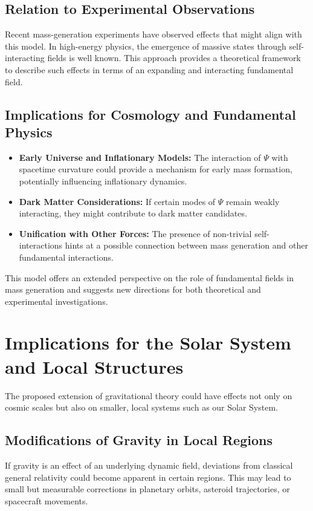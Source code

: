 \documentclass[a4paper,11pt]{article}
\begin{document}
\subsection{Relation to Experimental Observations}
Recent mass-generation experiments have observed effects that might align with this model. In high-energy physics, the emergence of massive states through self-interacting fields is well known. This approach provides a theoretical framework to describe such effects in terms of an expanding and interacting fundamental field.

\subsection{Implications for Cosmology and Fundamental Physics}
\begin{itemize}
	\item \textbf{Early Universe and Inflationary Models:} The interaction of $\Psi$ with spacetime curvature could provide a mechanism for early mass formation, potentially influencing inflationary dynamics.
	\item \textbf{Dark Matter Considerations:} If certain modes of $\Psi$ remain weakly interacting, they might contribute to dark matter candidates.
	\item \textbf{Unification with Other Forces:} The presence of non-trivial self-interactions hints at a possible connection between mass generation and other fundamental interactions.
\end{itemize}
This model offers an extended perspective on the role of fundamental fields in mass generation and suggests new directions for both theoretical and experimental investigations.
\section{Implications for the Solar System and Local Structures}
The proposed extension of gravitational theory could have effects not only on cosmic scales but also on smaller, local systems such as our Solar System.

\subsection{Modifications of Gravity in Local Regions}
If gravity is an effect of an underlying dynamic field, deviations from classical general relativity could become apparent in certain regions. This may lead to small but measurable corrections in planetary orbits, asteroid trajectories, or spacecraft movements.
\end{document}
